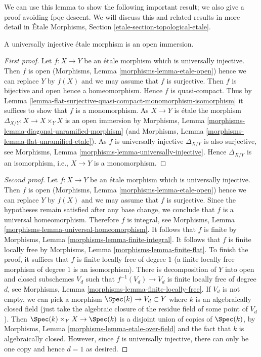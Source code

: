 \noindent
We can use this lemma to show the following important result; we also
give a proof avoiding fpqc descent.
We will discuss this and related results in more detail in
\'Etale Morphisms, Section \ref{etale-section-topological-etale}.

\begin{lemma}
\label{lemma-universally-injective-etale-open-immersion}
A universally injective \'etale morphism is an open immersion.
\end{lemma}

\begin{proof}[First proof]
Let $f : X \to Y$ be an \'etale morphism which is universally injective.
Then $f$ is open
(Morphisms, Lemma \ref{morphisms-lemma-etale-open})
hence we can replace $Y$ by $f(X)$ and we may assume that $f$ is surjective.
Then $f$ is bijective and open hence a homeomorphism. Hence $f$ is
quasi-compact. Thus by
Lemma \ref{lemma-flat-surjective-quasi-compact-monomorphism-isomorphism}
it suffices to show that $f$ is a monomorphism. As $X \to Y$ is \'etale
the morphism $\Delta_{X/Y} : X \to X \times_Y X$ is an open immersion by
Morphisms, Lemma \ref{morphisms-lemma-diagonal-unramified-morphism}
(and
Morphisms, Lemma \ref{morphisms-lemma-flat-unramified-etale}).
As $f$ is universally injective $\Delta_{X/Y}$ is also surjective, see
Morphisms, Lemma \ref{morphisms-lemma-universally-injective}.
Hence $\Delta_{X/Y}$ is an isomorphism, i.e., $X \to Y$ is a monomorphism.
\end{proof}

\begin{proof}[Second proof]
Let $f : X \to Y$ be an \'etale morphism which is universally injective.
Then $f$ is open (Morphisms, Lemma \ref{morphisms-lemma-etale-open})
hence we can replace $Y$ by $f(X)$ and we may assume that $f$ is surjective.
Since the hypotheses remain satisfied after any base change, we conclude
that $f$ is a universal homeomorphism. Therefore $f$ is integral, see
Morphisms, Lemma \ref{morphisms-lemma-universal-homeomorphism}.
It follows that $f$ is finite by
Morphisms, Lemma \ref{morphisms-lemma-finite-integral}.
It follows that $f$ is finite locally free by
Morphisms, Lemma \ref{morphisms-lemma-finite-flat}.
To finish the proof, it suffices that $f$ is finite locally
free of degree $1$ (a finite locally free morphism of degree $1$
is an isomorphism).
There is decomposition of $Y$ into open and closed subschemes
$V_d$ such that $f^{-1}(V_d) \to V_d$ is finite locally free of
degree $d$, see Morphisms, Lemma \ref{morphisms-lemma-finite-locally-free}.
If $V_d$ is not empty, we can pick a morphism $\Spec(k) \to V_d \subset Y$
where $k$ is an algebraically closed field (just take the algebraic
closure of the residue field of some point of $V_d$).
Then $\Spec(k) \times_Y X \to \Spec(k)$ is a disjoint union of
copies of $\Spec(k)$, by
Morphisms, Lemma \ref{morphisms-lemma-etale-over-field}
and the fact that $k$ is algebraically closed.
However, since $f$ is universally injective, there can only be
one copy and hence $d = 1$ as desired.
\end{proof}

